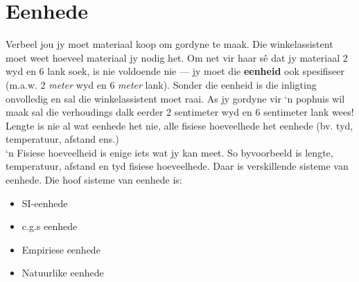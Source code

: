\section{Eenhede}
Verbeel jou jy moet materiaal koop om gordyne te maak. Die winkelassistent moet weet hoeveel materiaal jy nodig het. Om net vir haar sê dat jy materiaal 2 wyd en 6 lank soek, is nie voldoende nie --- jy moet die \textbf{eenheid} ook spesifiseer (m.a.w. 2 \textsl{meter} wyd en 6 \textsl{meter} lank). Sonder die eenheid is die inligting onvolledig en sal die winkelassistent moet raai. As jy gordyne vir ‘n pophuis wil maak sal die verhoudings dalk eerder 2 sentimeter wyd en 6 sentimeter lank wees!\\ 
Lengte is nie al wat eenhede het nie, alle fisiese hoeveelhede het eenhede (bv. tyd, temperatuur, afstand ens.)\\
 {‘n Fisiese hoeveelheid is enige iets wat jy kan meet. So byvoorbeeld is lengte, temperatuur, afstand en tyd fisiese hoeveelhede.} 
Daar is verskillende sisteme van eenhede. Die hoof sisteme van eenhede is: 
\begin{itemize}
 \item SI-eenhede
\item c.g.s eenhede
\item Empiriese eenhede
\item Natuurlike eenhede
\end{itemize}
